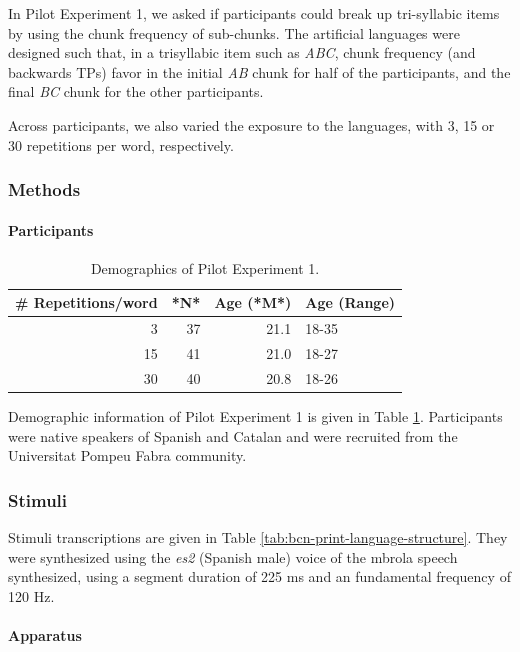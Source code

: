 \documentclass[
]{article}
\begin{document}
In Pilot Experiment 1, we asked if participants could break up
tri-syllabic items by using the chunk frequency of sub-chunks. The
artificial languages were designed such that, in a trisyllabic item such
as \emph{ABC}, chunk frequency (and backwards TPs) favor in the initial
\emph{AB} chunk for half of the participants, and the final \emph{BC}
chunk for the other participants.

Across participants, we also varied the exposure to the languages, with
3, 15 or 30 repetitions per word, respectively.

\subsubsection{Methods}\label{methods}

\paragraph{Participants}\label{participants-2}

\begin{longtable}[t]{rrrl}
\caption{\label{tab:bcn-demographics}Demographics of Pilot Experiment 1.}\\
\toprule
\# Repetitions/word & *N* & Age (*M*) & Age (Range)\\
\midrule
3 & 37 & 21.1 & 18-35\\
15 & 41 & 21.0 & 18-27\\
30 & 40 & 20.8 & 18-26\\
\bottomrule
\end{longtable}

Demographic information of Pilot Experiment 1 is given in Table
\ref{tab:bcn-demographics}. Participants were native speakers of Spanish
and Catalan and were recruited from the Universitat Pompeu Fabra
community.

\subsubsection{Stimuli}\label{stimuli-1}

Stimuli transcriptions are given in Table
\ref{tab:bcn-print-language-structure}. They were synthesized using the
\emph{es2} (Spanish male) voice of the mbrola \citep{mbrola} speech
synthesized, using a segment duration of 225 ms and an fundamental
frequency of 120 Hz.

\paragraph{Apparatus}\label{apparatus-1}
\end{document}
